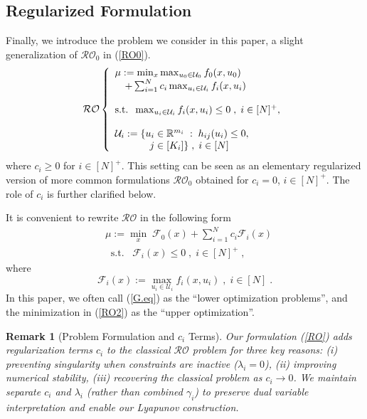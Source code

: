 \documentclass[journal,twoside,web]{ieeecolor}
\newcommand{\rev}[1]{\textcolor{revisionblue}{#1}}
\newtheorem{remark}{Remark}
\begin{document}
\subsection*{\rev{Regularized Formulation}}

Finally, we introduce the problem we consider in this paper, a slight generalization of $\mathcal{RO}_0$ in (\ref{RO0}).
\begin{equation}\mathcal{RO}\left\{\begin{array}{l}
\mu:=\min_{x} \max_{u_0\in \mathcal{U}_0} f_0(x,u_0)\\
\quad +\sum_{i=1}^N c_i \max_{u_i\in \mathcal{U}_i} f_i(x,u_i)\label{RO}\\ \\
\text{s.t.}\;\;\max_{u_i\in \mathcal{U}_i} f_i(x,u_i)\leq 0\;,\;i\in[N]^+,\\ \\
\mathcal{U}_i:=\{u_i\in \mathbb{R}^{m_i}\;:\;h_{ij}(u_i)\leq 0,\\
\hspace{3.5em} j\in[K_i]\}\;,\;i\in[N]
\end{array}\right.
\end{equation}
where $c_i\geq 0$ for $i\in[N]^+$. This setting can be seen as an elementary regularized version of more common formulations $\mathcal{RO}_0$ obtained for $c_i=0$, $i\in[N]^+$.
The role of $c_i$ is further clarified below.

It is convenient to rewrite $\mathcal{RO}$ in the following form
\begin{align}
&\mu:=\underset{x}{\min} \; \mathcal{F}_0(x)+\sum_{i=1}^N c_i\mathcal{F}_i(x)\label{RO2}\\
&\;\;\text{s.t.}\;\;\;\mathcal{F}_i(x)\leq 0\;,\;i\in[N]^+\;,\nonumber
\end{align}
where
\begin{equation}\label{G.eq}
\mathcal{F}_i(x):=\max_{u_i\in \mathcal{U}_i} f_i(x,u_i)\;,\; i\in[N]\;.
\end{equation}
In this paper, we often call (\ref{G.eq}) as the ``lower optimization problems'', and the minimization in (\ref{RO2}) as the ``upper optimization''.

\begin{remark}[\rev{Problem Formulation and $c_i$ Terms}]
\rev{Our formulation (\ref{RO}) adds regularization terms $c_i$ to the classical $\mathcal{RO}$ problem for three key reasons: (i) preventing singularity when constraints are inactive ($\lambda_i = 0$), (ii) improving numerical stability, (iii) recovering the classical problem as $c_i \to 0$. We maintain separate $c_i$ and $\lambda_i$ (rather than combined $\gamma_i$) to preserve dual variable interpretation and enable our Lyapunov construction.}
\end{remark}
\end{document}
